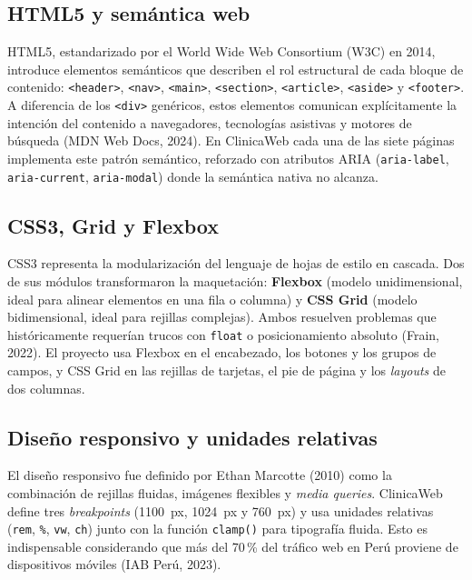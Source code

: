 \documentclass[11pt,a4paper]{article}
\begin{document}
\subsection{HTML5 y semántica web}
HTML5, estandarizado por el World Wide Web Consortium (W3C) en 2014, introduce elementos semánticos que describen el rol estructural de cada bloque de contenido: \lstinline|<header>|, \lstinline|<nav>|, \lstinline|<main>|, \lstinline|<section>|, \lstinline|<article>|, \lstinline|<aside>| y \lstinline|<footer>|. A diferencia de los \lstinline|<div>| genéricos, estos elementos comunican explícitamente la intención del contenido a navegadores, tecnologías asistivas y motores de búsqueda (MDN Web Docs, 2024). En ClinicaWeb cada una de las siete páginas implementa este patrón semántico, reforzado con atributos ARIA (\lstinline|aria-label|, \lstinline|aria-current|, \lstinline|aria-modal|) donde la semántica nativa no alcanza.

\subsection{CSS3, Grid y Flexbox}
CSS3 representa la modularización del lenguaje de hojas de estilo en cascada. Dos de sus módulos transformaron la maquetación: \textbf{Flexbox} (modelo unidimensional, ideal para alinear elementos en una fila o columna) y \textbf{CSS Grid} (modelo bidimensional, ideal para rejillas complejas). Ambos resuelven problemas que históricamente requerían trucos con \lstinline|float| o posicionamiento absoluto (Frain, 2022). El proyecto usa Flexbox en el encabezado, los botones y los grupos de campos, y CSS Grid en las rejillas de tarjetas, el pie de página y los \emph{layouts} de dos columnas.

\subsection{Diseño responsivo y unidades relativas}
El diseño responsivo fue definido por Ethan Marcotte (2010) como la combinación de rejillas fluidas, imágenes flexibles y \emph{media queries}. ClinicaWeb define tres \emph{breakpoints} (1100~px, 1024~px y 760~px) y usa unidades relativas (\lstinline|rem|, \lstinline|%|, \lstinline|vw|, \lstinline|ch|) junto con la función \lstinline|clamp()| para tipografía fluida. Esto es indispensable considerando que más del 70\,\% del tráfico web en Perú proviene de dispositivos móviles (IAB Perú, 2023).
\end{document}
